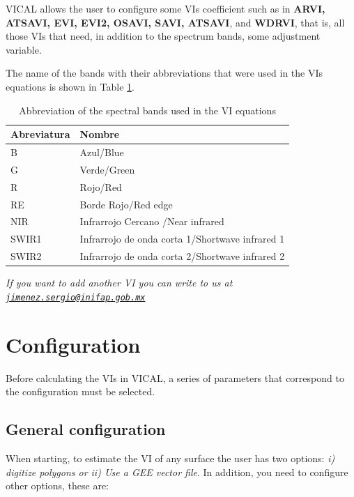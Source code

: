 \documentclass[
]{book}
\begin{document}
VICAL allows the user to configure some VIs coefficient such as in \textbf{ARVI, ATSAVI, EVI, EVI2, OSAVI, SAVI, ATSAVI}, and \textbf{WDRVI}, that is, all those VIs that need, in addition to the spectrum bands, some adjustment variable.

The name of the bands with their abbreviations that were used in the VIs equations is shown in Table \ref{tab:inOMBRE}.

\begin{table}

\caption{\label{tab:inOMBRE}Abbreviation of the spectral bands used in the VI equations}
\centering
\begin{tabular}[t]{ll}
\toprule
Abreviatura & Nombre\\
\midrule
B & Azul/Blue\\
G & Verde/Green\\
R & Rojo/Red\\
RE & Borde Rojo/Red edge\\
NIR & Infrarrojo Cercano /Near infrared\\
\addlinespace
SWIR1 & Infrarrojo de onda corta 1/Shortwave infrared 1\\
SWIR2 & Infrarrojo de onda corta 2/Shortwave infrared 2\\
\bottomrule
\end{tabular}
\end{table}

\emph{If you want to add another VI you can write to us at \href{mailto:jimenez.sergio@inifap.gob.mx}{\nolinkurl{jimenez.sergio@inifap.gob.mx}}}

\hypertarget{configuration}{%
\chapter{Configuration}\label{configuration}}

Before calculating the VIs in VICAL, a series of parameters that correspond to the configuration must be selected.

\hypertarget{general-configuration}{%
\section{General configuration}\label{general-configuration}}

When starting, to estimate the VI of any surface the user has two options: \emph{i) digitize polygons or ii) Use a GEE vector file}. In addition, you need to configure other options, these are:
\end{document}

